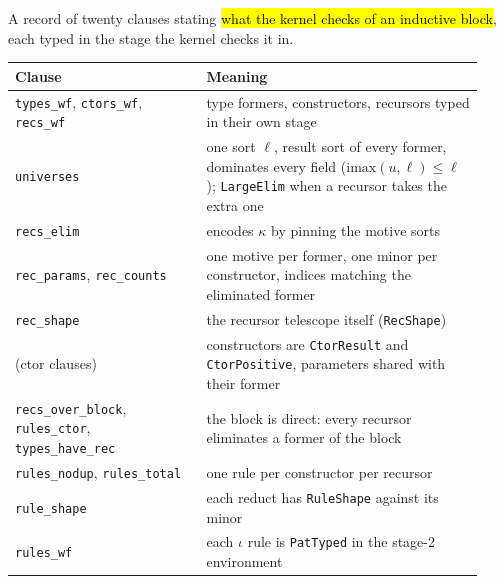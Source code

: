 \begin{definition}
\label{structure:ind-wf}
\leanok
{} 

 A record of twenty clauses stating \hl{what the kernel checks of an
inductive block}, each typed in the stage the kernel checks it in.
\begin{center}
\begin{tabular}{p{0.38\linewidth}p{0.55\linewidth}}
\toprule
Clause & Meaning \\
\midrule
\texttt{types\_wf}, \texttt{ctors\_wf}, \texttt{recs\_wf} & type formers, constructors,
recursors typed in their own stage \\
\texttt{universes} & one sort $\ell$, result sort of every former, dominates every field
($\mathrm{imax}(u,\ell)\le\ell$); \texttt{LargeElim} when a recursor takes the extra one \\
\texttt{recs\_elim} & encodes $\kappa$ by pinning the motive sorts \\
\texttt{rec\_params}, \texttt{rec\_counts} & one motive per former, one minor per
constructor, indices matching the eliminated former \\
\texttt{rec\_shape} & the recursor telescope itself (\texttt{RecShape}) \\
(ctor clauses) & constructors are \texttt{CtorResult} and \texttt{CtorPositive}, parameters
shared with their former \\
\texttt{recs\_over\_block}, \texttt{rules\_ctor}, \texttt{types\_have\_rec} & the block is
direct: every recursor eliminates a former of the block \\
\texttt{rules\_nodup}, \texttt{rules\_total} & one rule per constructor per recursor \\
\texttt{rule\_shape} & each reduct has \texttt{RuleShape} against its minor \\
\texttt{rules\_wf} & each $\iota$ rule is \texttt{PatTyped} in the stage-2 environment \\
\bottomrule
\end{tabular}\par\smallskip

\end{center}
\end{definition}
